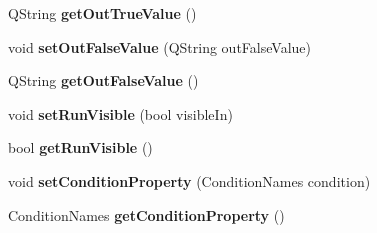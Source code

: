 \begin{DoxyCompactItemize}
\item 
\hypertarget{classQELink_abfae26abac122ab582aca59b16c87dbc}{
QString {\bfseries getOutTrueValue} ()}
\label{classQELink_abfae26abac122ab582aca59b16c87dbc}

\item 
\hypertarget{classQELink_aeea7e9b1df802527e631e076e98f162e}{
void {\bfseries setOutFalseValue} (QString outFalseValue)}
\label{classQELink_aeea7e9b1df802527e631e076e98f162e}

\item 
\hypertarget{classQELink_af067479aaf906b5ba76a5bf892b95c8d}{
QString {\bfseries getOutFalseValue} ()}
\label{classQELink_af067479aaf906b5ba76a5bf892b95c8d}

\item 
\hypertarget{classQELink_af6d88bf370239426e333b8d45c8348af}{
void {\bfseries setRunVisible} (bool visibleIn)}
\label{classQELink_af6d88bf370239426e333b8d45c8348af}

\item 
\hypertarget{classQELink_a6735abb53f7b260809b0435e25602e43}{
bool {\bfseries getRunVisible} ()}
\label{classQELink_a6735abb53f7b260809b0435e25602e43}

\item 
\hypertarget{classQELink_a1266b86af77514105646113a36cd87f4}{
void {\bfseries setConditionProperty} (ConditionNames condition)}
\label{classQELink_a1266b86af77514105646113a36cd87f4}

\item 
\hypertarget{classQELink_a34317106f66b940c2f66b8fa007cd5c9}{
ConditionNames {\bfseries getConditionProperty} ()}
\label{classQELink_a34317106f66b940c2f66b8fa007cd5c9}

\end{DoxyCompactItemize}
